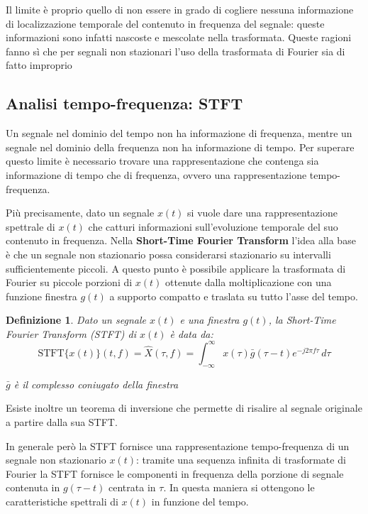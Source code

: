 \documentclass[12pt, a4paper]{article}
\newtheorem*{definition}{Definizione}
\begin{document}
Il limite è proprio quello di non essere in grado di cogliere nessuna informazione di localizzazione temporale del contenuto in frequenza del segnale: queste informazioni sono infatti nascoste e mescolate nella trasformata.
Queste ragioni fanno sì che per segnali non stazionari l'uso della trasformata di Fourier sia di fatto improprio

\subsection{Analisi tempo-frequenza: STFT}

Un segnale nel dominio del tempo non ha informazione di frequenza, mentre un segnale nel dominio della frequenza non ha informazione di tempo. Per superare questo limite è necessario trovare una rappresentazione che contenga sia informazione di tempo che di frequenza, ovvero una rappresentazione tempo-frequenza.
\vspace{0.5em}

Più precisamente, dato un segnale $x(t)$ si vuole dare una rappresentazione spettrale di $x(t)$ che catturi informazioni sull'evoluzione temporale del suo contenuto in frequenza.
Nella \textbf{Short-Time Fourier Transform} l'idea alla base è che un segnale non stazionario possa considerarsi stazionario su intervalli sufficientemente piccoli. A questo punto è possibile applicare la trasformata di Fourier su piccole porzioni di $x(t)$ ottenute dalla moltiplicazione con una funzione finestra $g(t)$ a supporto compatto e traslata su tutto l'asse del tempo.

\begin{definition}

  Dato un segnale $x(t)$ e una finestra $g(t)$, la Short-Time Fourier Transform (STFT) di $x(t)$ è data da:
  \[
    \text{STFT}\{x(t)\}(t, f) = \hat{X}(\tau, f) =  \int_{-\infty}^{\infty} x(\tau) \bar{g} (\tau - t) e^{-j 2\pi f \tau} \, d\tau
  \]

  $\bar{g}$ è il complesso coniugato della finestra
\end{definition}

Esiste inoltre un teorema di inversione che permette di risalire al segnale originale a partire dalla sua STFT.
\vspace{0.5em}

In generale però la STFT fornisce una rappresentazione tempo-frequenza di un segnale non stazionario $x(t)$: tramite una sequenza infinita di trasformate di Fourier la STFT fornisce le componenti in frequenza della porzione di segnale contenuta in $g(\tau - t)$ centrata in $\tau$. In questa maniera si ottengono le caratteristiche spettrali di $x(t)$ in funzione del tempo.
\vspace{0.5em}
\end{document}
